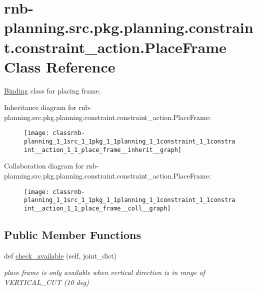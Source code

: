 \hypertarget{classrnb-planning_1_1src_1_1pkg_1_1planning_1_1constraint_1_1constraint__action_1_1_place_frame}{}\section{rnb-\/planning.src.\+pkg.\+planning.\+constraint.\+constraint\+\_\+action.\+Place\+Frame Class Reference}
\label{classrnb-planning_1_1src_1_1pkg_1_1planning_1_1constraint_1_1constraint__action_1_1_place_frame}


\hyperlink{classrnb-planning_1_1src_1_1pkg_1_1planning_1_1constraint_1_1constraint__action_1_1_binding}{Binding} class for placing frame.  




Inheritance diagram for rnb-\/planning.src.\+pkg.\+planning.\+constraint.\+constraint\+\_\+action.\+Place\+Frame\+:
\nopagebreak
\begin{figure}[H]
\begin{center}
\leavevmode
\texttt{[image: classrnb-planning\_1\_1src\_1\_1pkg\_1\_1planning\_1\_1constraint\_1\_1constraint\_\_action\_1\_1\_place\_frame\_\_inherit\_\_graph]}
\end{center}
\end{figure}


Collaboration diagram for rnb-\/planning.src.\+pkg.\+planning.\+constraint.\+constraint\+\_\+action.\+Place\+Frame\+:
\nopagebreak
\begin{figure}[H]
\begin{center}
\leavevmode
\texttt{[image: classrnb-planning\_1\_1src\_1\_1pkg\_1\_1planning\_1\_1constraint\_1\_1constraint\_\_action\_1\_1\_place\_frame\_\_coll\_\_graph]}
\end{center}
\end{figure}
\subsection*{Public Member Functions}
\begin{DoxyCompactItemize}
\item 
\mbox{\label{classrnb-planning_1_1src_1_1pkg_1_1planning_1_1constraint_1_1constraint__action_1_1_place_frame_a584bda652ca8c6144bb9bbc16de1f854}} 
def \hyperlink{classrnb-planning_1_1src_1_1pkg_1_1planning_1_1constraint_1_1constraint__action_1_1_place_frame_a584bda652ca8c6144bb9bbc16de1f854}{check\+\_\+available} (self, joint\+\_\+dict)
\begin{DoxyCompactList}\small\item\em place frame is only available when vertical direction is in range of V\+E\+R\+T\+I\+C\+A\+L\+\_\+\+C\+UT (10 deg) \end{DoxyCompactList}\end{DoxyCompactItemize}
